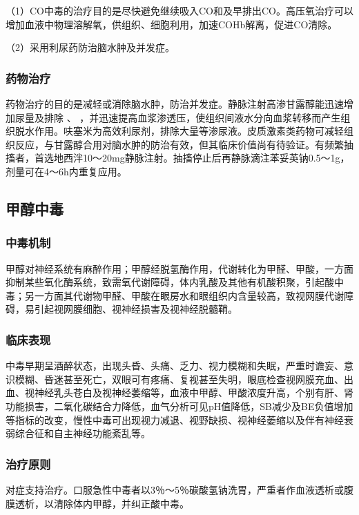 （1）CO中毒的治疗目的是尽快避免继续吸入CO和及早排出CO。高压氧治疗可以增加血液中物理溶解氧，供组织、细胞利用，加速COHb解离，促进CO清除。

（2）采用利尿药防治脑水肿及并发症。

\subsubsection{药物治疗}

药物治疗的目的是减轻或消除脑水肿，防治并发症。静脉注射高渗甘露醇能迅速增加尿量及排除
、
，并迅速提高血浆渗透压，使组织间液水分向血浆转移而产生组织脱水作用。呋塞米为高效利尿剂，排除大量等渗尿液。皮质激素类药物可减轻组织反应，与甘露醇合用对脑水肿的防治有效，但其临床价值尚有待验证。有频繁抽搐者，首选地西泮10～20mg静脉注射。抽搐停止后再静脉滴注苯妥英钠0.5～1g，剂量可在4～6h内重复应用。

\subsection{甲醇中毒}

\subsubsection{中毒机制}

甲醇对神经系统有麻醉作用；甲醇经脱氢酶作用，代谢转化为甲醛、甲酸，一方面抑制某些氧化酶系统，致需氧代谢障碍，体内乳酸及其他有机酸积聚，引起酸中毒；另一方面其代谢物甲醛、甲酸在眼房水和眼组织内含量较高，致视网膜代谢障碍，易引起视网膜细胞、视神经损害及视神经脱髓鞘。

\subsubsection{临床表现}

中毒早期呈酒醉状态，出现头昏、头痛、乏力、视力模糊和失眠，严重时谵妄、意识模糊、昏迷甚至死亡，双眼可有疼痛、复视甚至失明，眼底检查视网膜充血、出血、视神经乳头苍白及视神经萎缩等，血液中甲醇、甲酸浓度升高，个别有肝、肾功能损害，二氧化碳结合力降低，血气分析可见pH值降低，SB减少及BE负值增加等指标的改变，慢性中毒可出现视力减退、视野缺损、视神经萎缩以及伴有神经衰弱综合征和自主神经功能紊乱等。

\subsubsection{治疗原则}

对症支持治疗。口服急性中毒者以3％～5％碳酸氢钠洗胃，严重者作血液透析或腹膜透析，以清除体内甲醇，并纠正酸中毒。

